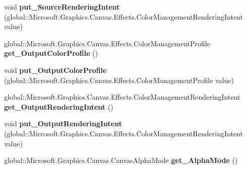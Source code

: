 \begin{DoxyCompactItemize}
void {\bfseries put\+\_\+\+Source\+Rendering\+Intent} (global\+::\+Microsoft.\+Graphics.\+Canvas.\+Effects.\+Color\+Management\+Rendering\+Intent value)
\item 
\mbox{\label{interface_microsoft_1_1_graphics_1_1_canvas_1_1_effects_1_1_i_color_management_effect_a6fac8f330f6ff6d98ef14cef1e6f5663}} 
global\+::\+Microsoft.\+Graphics.\+Canvas.\+Effects.\+Color\+Management\+Profile {\bfseries get\+\_\+\+Output\+Color\+Profile} ()
\item 
\mbox{\label{interface_microsoft_1_1_graphics_1_1_canvas_1_1_effects_1_1_i_color_management_effect_a9dd341e021ce085924bf27decaeaaf6e}} 
void {\bfseries put\+\_\+\+Output\+Color\+Profile} (global\+::\+Microsoft.\+Graphics.\+Canvas.\+Effects.\+Color\+Management\+Profile value)
\item 
\mbox{\label{interface_microsoft_1_1_graphics_1_1_canvas_1_1_effects_1_1_i_color_management_effect_a1a0a5108efc4f507ad103a59c30284a8}} 
global\+::\+Microsoft.\+Graphics.\+Canvas.\+Effects.\+Color\+Management\+Rendering\+Intent {\bfseries get\+\_\+\+Output\+Rendering\+Intent} ()
\item 
\mbox{\label{interface_microsoft_1_1_graphics_1_1_canvas_1_1_effects_1_1_i_color_management_effect_ac8cbecd84f1efff87ca7977bdb11871b}} 
void {\bfseries put\+\_\+\+Output\+Rendering\+Intent} (global\+::\+Microsoft.\+Graphics.\+Canvas.\+Effects.\+Color\+Management\+Rendering\+Intent value)
\item 
\mbox{\label{interface_microsoft_1_1_graphics_1_1_canvas_1_1_effects_1_1_i_color_management_effect_a7d4117ceb7538a6087fe55cec1fe1dae}} 
global\+::\+Microsoft.\+Graphics.\+Canvas.\+Canvas\+Alpha\+Mode {\bfseries get\+\_\+\+Alpha\+Mode} ()
\item 
\mbox{\label{interface_microsoft_1_1_graphics_1_1_canvas_1_1_effects_1_1_i_color_management_effect_af51f08ac38859f62bfa6854da45d846e}} 

\end{DoxyCompactItemize}
